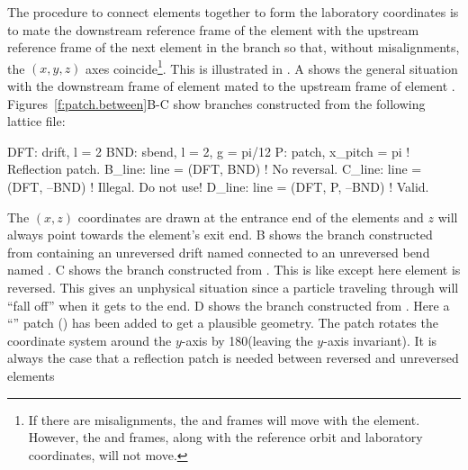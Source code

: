 The procedure to connect elements together to form the laboratory coordinates is to mate the
downstream reference frame of the element with the upstream reference frame of the next element in
the branch so that, without misalignments, the $(x,y,z)$ axes coincide\footnote
  {
If there are misalignments, the  and  frames will move with the element. However,
the  and  frames, along with the reference orbit and laboratory
coordinates, will not move.
  }. 
This is illustrated in . A shows the general situation
with the downstream frame of element  mated to the upstream frame of element .
Figures~\ref{f:patch.between}B-C show branches constructed from the following lattice file:
\begin{example}
  DFT: drift, l = 2
  BND: sbend, l = 2, g = pi/12
  P: patch, x_pitch = pi          ! Reflection patch.
  B_line: line = (DFT, BND)       ! No reversal.
  C_line: line = (DFT, --BND)     ! Illegal. Do not use!
  D_line: line = (DFT, P, --BND)  ! Valid.
\end{example}
The $(x,z)$ coordinates are drawn at the entrance end of the elements and $z$ will always point
towards the element's exit end.  B shows the branch constructed from
 containing an unreversed drift named  connected to an unreversed bend named
. C shows the branch constructed from . This is like
 except here element  is reversed. This gives an unphysical situation since a
particle traveling through  will ``fall off'' when it gets to the end.
D shows the branch constructed from . Here a ``''
patch  () has been added to get a plausible geometry. The patch rotates the
coordinate system around the $y$-axis by 180\Deg (leaving the $y$-axis invariant). It is always the
case that a reflection patch is needed between reversed and unreversed elements


